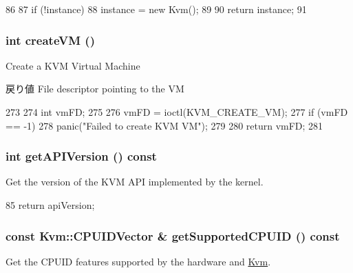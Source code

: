 \begin{DoxyCode}
86 {
87     if (!instance)
88         instance = new Kvm();
89 
90     return instance;
91 }
\end{DoxyCode}
\hypertarget{classKvm_acac1d5ae396f1e3fb2804d78bc986db2}{
\subsubsection[{createVM}]{\setlength{\rightskip}{0pt plus 5cm}int createVM ()}}
\label{classKvm_acac1d5ae396f1e3fb2804d78bc986db2}
Create a KVM Virtual Machine

\begin{DoxyReturn}{戻り値}
File descriptor pointing to the VM 
\end{DoxyReturn}



\begin{DoxyCode}
273 {
274     int vmFD;
275 
276     vmFD = ioctl(KVM_CREATE_VM);
277     if (vmFD == -1)
278         panic("Failed to create KVM VM\n");
279 
280     return vmFD;
281 }
\end{DoxyCode}
\hypertarget{classKvm_a5bbf835d489e2bd0242d5b3840aa1304}{
\subsubsection[{getAPIVersion}]{\setlength{\rightskip}{0pt plus 5cm}int getAPIVersion () const}}
\label{classKvm_a5bbf835d489e2bd0242d5b3840aa1304}
Get the version of the KVM API implemented by the kernel. 


\begin{DoxyCode}
85 { return apiVersion; }
\end{DoxyCode}
\hypertarget{classKvm_aa0fc800a2144e592218a484d24b94f0f}{
\subsubsection[{getSupportedCPUID}]{\setlength{\rightskip}{0pt plus 5cm}const {\bf Kvm::CPUIDVector} \& getSupportedCPUID () const}}
\label{classKvm_aa0fc800a2144e592218a484d24b94f0f}
Get the CPUID features supported by the hardware and \hyperlink{classKvm}{Kvm}.

